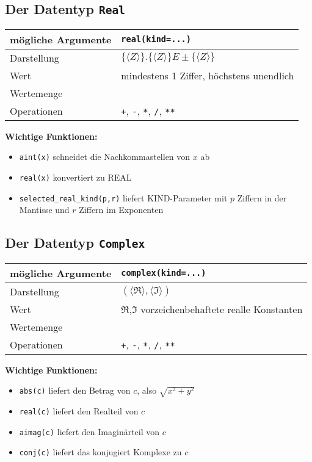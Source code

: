 \subsection{Der Datentyp \texttt{Real}}
	\begin{tabular}{l|l}
		mögliche Argumente & \texttt{real(kind=...)} \\
		\hline
		Darstellung & $\{\langle Z\rangle\}.\{\langle Z\rangle\}E\pm\{\langle Z\rangle\}$ \\
		\hline
		Wert & mindestens 1 Ziffer, höchstens unendlich \\
		\hline
		Wertemenge &  \\
		\hline
		Operationen & \texttt{+}, \texttt{-}, \texttt{*}, \texttt{/}, \texttt{**}
	\end{tabular}

\textbf{Wichtige Funktionen:}
\begin{itemize}
	\item\texttt{aint(x)} schneidet die Nachkommastellen von $x$ ab
	\item\texttt{real(x)} konvertiert zu REAL
	\item\texttt{selected\_real\_kind(p,r)} liefert KIND-Parameter mit $p$ Ziffern in der Mantisse und $r$ Ziffern im Exponenten
\end{itemize}

\subsection{Der Datentyp \texttt{Complex}}
	\begin{tabular}{l|l}
		mögliche Argumente & \texttt{complex(kind=...)} \\
		\hline
		Darstellung & $(\langle\Re\rangle,\langle\Im\rangle)$ \\
		\hline
		Wert &$\Re$,$\Im$ vorzeichenbehaftete realle Konstanten \\
		\hline
		Wertemenge &  \\
		\hline
		Operationen & \texttt{+}, \texttt{-}, \texttt{*}, \texttt{/}, \texttt{**}
	\end{tabular}

\textbf{Wichtige Funktionen:}
\begin{itemize}
	\item\texttt{abs(c)} liefert den Betrag von $c$, also $\sqrt{x^2+y^2}$
	\item\texttt{real(c)} liefert den Realteil von $c$
	\item\texttt{aimag(c)} liefert den Imaginärteil von $c$
	\item\texttt{conj(c)} liefert das konjugiert Komplexe zu $c$
\end{itemize}

